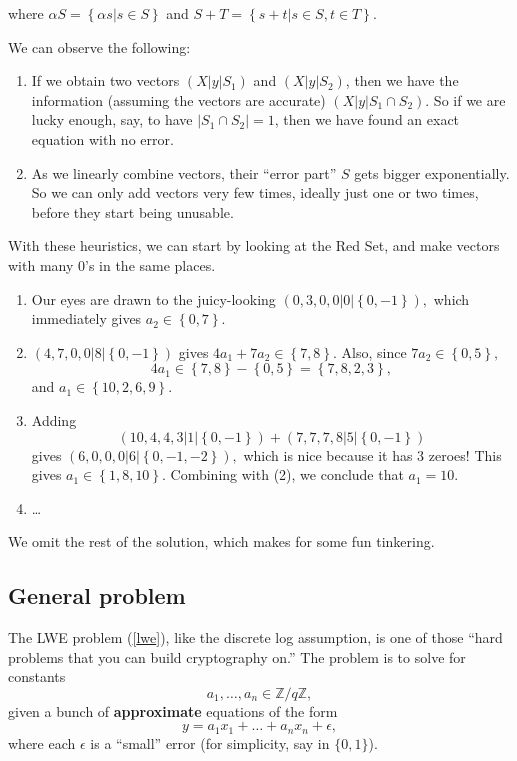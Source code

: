 where \(\alpha S = \left\{ \alpha s|s \in S \right\}\) and
\(S + T = \left\{ s + t|s \in S,t \in T \right\}\).

We can observe the following:

\begin{enumerate}
\item
  If we obtain two vectors \(\left( X|y|S_{1} \right)\) and
  \(\left( X|y|S_{2} \right)\), then we have the information (assuming
  the vectors are accurate) \(\left( X|y|S_{1} \cap S_{2} \right)\). So
  if we are lucky enough, say, to have
  \(\left| S_{1} \cap S_{2} \right| = 1\), then we have found an exact
  equation with no error.
\item
  As we linearly combine vectors, their ``error part'' \(S\) gets bigger
  exponentially. So we can only add vectors very few times, ideally just
  one or two times, before they start being unusable.
\end{enumerate}

With these heuristics, we can start by looking at the Red Set, and make
vectors with many \(0\)'s in the same places.

\begin{enumerate}
\item
  Our eyes are drawn to the juicy-looking
  \(\left( 0,3,0,0|0|\left\{ 0, - 1 \right\} \right),\) which
  immediately gives \(a_{2} \in \left\{ 0,7 \right\}\).
\item
  \(\left( 4,7,0,0|8|\left\{ 0, - 1 \right\} \right)\) gives
  \(4a_{1} + 7a_{2} \in \left\{ 7,8 \right\}.\) Also, since
  \(7a_{2} \in \left\{ 0,5 \right\},\)
  \[4a_{1} \in \left\{ 7,8 \right\} - \left\{ 0,5 \right\} = \left\{ 7,8,2,3 \right\},\]
  and \(a_{1} \in \left\{ 10,2,6,9 \right\}.\)
\item
  Adding
  \[\left( 10,4,4,3|1|\left\{ 0, - 1 \right\} \right) + \left( 7,7,7,8|5|\left\{ 0, - 1 \right\} \right)\]
  gives \(\left( 6,0,0,0|6|\left\{ 0, - 1, - 2 \right\} \right),\) which
  is nice because it has 3 zeroes! This gives
  \(a_{1} \in \left\{ 1,8,10 \right\}.\) Combining with (2), we conclude
  that \(a_{1} = 10.\)
\item
  \ldots{}
\end{enumerate}

We omit the rest of the solution, which makes for some fun tinkering.

\subsection{General problem}

The LWE problem (\hyperref[lwe]{{[}lwe{]}}), like the discrete log
assumption, is one of those ``hard problems that you can build
cryptography on.'' The problem is to solve for constants
\[a_{1},\ldots,a_{n} \in {\mathbb{Z}}/q{\mathbb{Z}},\] given a bunch of
\textbf{approximate} equations of the form
\[y = a_{1}x_{1} + \ldots + a_{n}x_{n} + \epsilon,\] where each
\(\epsilon\) is a ``small'' error (for simplicity, say in \(\{ 0,1\}\)).
